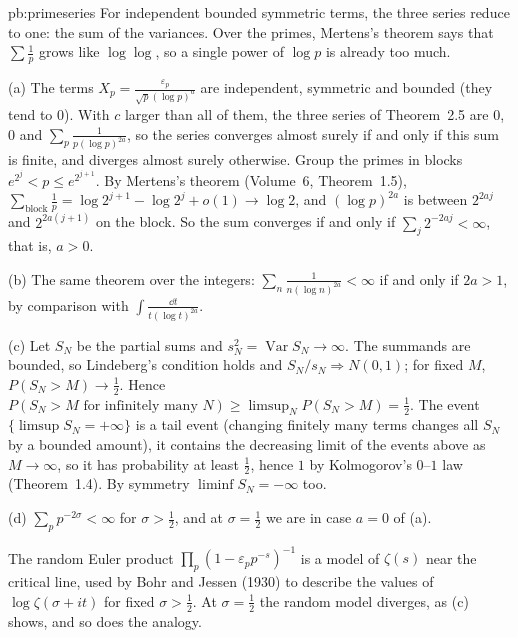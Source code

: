 \begin{solution}{pb:primeseries}
\idea For independent bounded symmetric terms, the three series reduce to one: the sum of the variances. Over the primes, Mertens's theorem says that $\sum\frac1p$ grows like
$\log\log$, so a single power of $\log p$ is already too much.

\writeup (a) The terms $X_p=\frac{\varepsilon_p}{\sqrt p(\log p)^a}$ are independent, symmetric and bounded (they tend to $0$). With $c$ larger than all of them, the three
series of Theorem~2.5 are $0$, $0$ and $\sum_p\frac1{p(\log p)^{2a}}$, so the series converges almost surely if and only if this sum is finite, and
diverges almost surely otherwise. Group the primes in blocks $e^{2^j}<p\le e^{2^{j+1}}$. By Mertens's theorem (Volume~6, Theorem~1.5),
$\sum_{\text{block}}\frac1p=\log2^{j+1}-\log2^j+o(1)\to\log2$, and $(\log p)^{2a}$ is between $2^{2aj}$ and $2^{2a(j+1)}$ on the block. So the sum converges if and only if
$\sum_j2^{-2aj}<\infty$, that is, $a>0$.

(b) The same theorem over the integers: $\sum_n\frac1{n(\log n)^{2a}}<\infty$ if and only if $2a>1$, by comparison with $\int\frac{\dd t}{t(\log t)^{2a}}$.

(c) Let $S_N$ be the partial sums and $s_N^2=\operatorname{Var}S_N\to\infty$. The summands are bounded, so Lindeberg's condition holds and $S_N/s_N\Rightarrow N(0,1)$; for fixed $M$,
$P(S_N>M)\to\frac12$. Hence $P(S_N>M\text{ for infinitely many }N)\ge\limsup_NP(S_N>M)=\frac12$. The event $\{\limsup S_N=+\infty\}$ is a tail event (changing finitely many terms
changes all $S_N$ by a bounded amount), it contains the decreasing limit of the events above as $M\to\infty$, so it has probability at least $\frac12$, hence $1$ by
Kolmogorov's $0$--$1$ law (Theorem~1.4). By symmetry $\liminf S_N=-\infty$ too.

(d) $\sum_pp^{-2\sigma}<\infty$ for $\sigma>\frac12$, and at $\sigma=\frac12$ we are in case $a=0$ of (a).

\leads The random Euler product $\prod_p(1-\varepsilon_pp^{-s})^{-1}$ is a model of $\zeta(s)$ near the critical line, used by Bohr and Jessen (1930) to describe the values of
$\log\zeta(\sigma+it)$ for fixed $\sigma>\frac12$. At $\sigma=\frac12$ the random model diverges, as (c) shows, and so does the analogy.
\end{solution}

